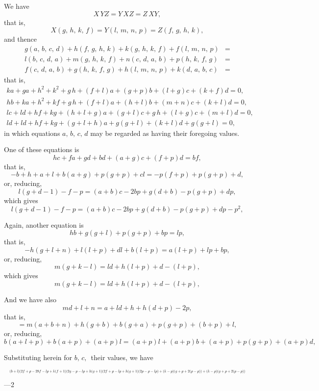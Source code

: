 \documentclass[11pt]{article}
\begin{document}
\noindent
We have
\[
X\,YZ = Y\,XZ = Z\,XY,
\]
that is,
\[
X(g,\,h,\,k,\,f) = Y(l,\,m,\,n,\,p) = Z(f,\,g,\,h,\,k),
\]
and thence
\begin{align*}
g(a,\,b,\,c,\,d) + h(f,\,g,\,h,\,k) + k(g,\,h,\,k,\,f) + f(l,\,m,\,n,\,p) &= \\
l(b,\,c,\,d,\,a) + m(g,\,h,\,k,\,f) + n(c,\,d,\,a,\,b) + p(h,\,k,\,f,\,g) &= \\
f(c,\,d,\,a,\,b) + g(h,\,k,\,f,\,g) + h(l,\,m,\,n,\,p) + k(d,\,a,\,b,\,c) &=
\end{align*}
that is,
\begin{align*}
ka + ga + h^2 + k^2 + g\,h + (f + l)a + (g + p)b + (l + g)c + (k + f)d = 0,\\
hb + ka + h^2 + kf + g\,h + (f + l)a + (h + l)b + (m + n)c + (k + l)d = 0,\\
lc + ld + hf + kg + (h + l + g)a + (g + l)c + g\,h + (l + g)c + (m + l)d = 0,\\
ld + ld + hf + kg + (g + l + h)a + g(g + l) + (k + l)d + g(g + l) = 0,
\end{align*}
in which equations $a,\,b,\,c,\,d$ may be regarded as having their foregoing values.

\medskip

\noindent
One of these equations is
\[
hc + fa + gd + bd + (a + g)c + (f + p)d = bf,
\]
that is,
\[
-b + h + a + l + b(a + g) + p(g + p) + cl = -p(f + p) + p(g + p) + d,
\]
or, reducing,
\[
l(g + d - 1) - f - p = (a + b)c - 2bp + g(d + b) - p(g + p) + dp,
\]
which gives
\[
l(g + d - 1) - f - p = (a + b)c - 2bp + g(d + b) - p(g + p) + dp - p^2,
\]

\noindent
Again, another equation is
\[
hb + g(g + l) + p(g + p) + bp = lp,
\]
that is,
\[
-h(g + l + n) + l(l + p) + dl + b(l + p) = a(l + p) + lp + bp,
\]
or, reducing,
\[
m(g + k - l) = ld + h(l + p) + d - (l + p),
\]
which gives
\[
m(g + k - l) = ld + h(l + p) + d - (l + p),
\]

\noindent
And we have also
\[
md + l + n = a + ld + h + h(d + p) - 2p,
\]
that is,
\[
= m(a + b + n) + h(g + b) + b(g + a) + p(g + p) + (b + p) + l,
\]
or, reducing,
\[
b(a + l + p) + b(a + p) + (a + p)l = (a + p)l + (a + p)b + (a + p) + p(g + p) + (a + p)d,
\]

\noindent
Substituting herein for $b,\,c,\,$ their values, we have
\[ \resizebox{\textwidth}{!}{$\displaystyle (b + l)(2f + p - 28f - lp + k(f + 1)(2g - p - lp + h(g + 1)(2f + p - lp + h(g + 1)(2p - p - lp) + (k - p)(g + p + 2(p - p)) + (k - p)(g + p + 2(p - p)) $} \]
\medskip{}---2
\end{document}
